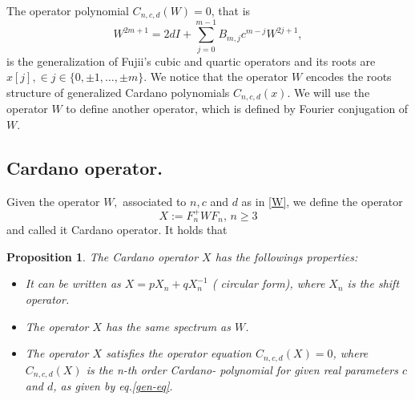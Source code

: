 \documentclass[11pt,reqno]{amsart}
\newtheorem{proposition}[theorem]{Proposition}
\begin{document}
The operator polynomial $C_{n,c,d}(W)=0$, that is 
\begin{equation}\label{CO}
    W^{2m+1}=2dI+\sum\limits_{j=0}^{m-1}B_{m,j}c^{m-j}W^{2j+1},
\end{equation}
is the generalization of Fujii's cubic and quartic operators\cite{Fujii2013} and its roots are $x[j],\in j\in\{0, \pm 1,\ldots, \pm m\}$. We notice that the operator $W$ encodes the roots structure of generalized Cardano polynomials $C_{n,c,d}(x)$. We will use the operator $W$ to define another operator, which is defined by Fourier conjugation of $W$.

\subsection{Cardano operator.}
Given the operator $W,$ associated to $n, c$ and $d$ as in \eqref{W}, we define the operator 
\begin{equation} \label{Cardano-operator}X:=F_n^+WF_n,\, n\geq 3\end{equation} and called it Cardano operator. It holds that
\begin{proposition}\label{th-X}
  The Cardano operator $X$ has the followings properties:  
  \begin{itemize}
      \item[a)] It can be written as $X=pX_n+qX_n^{-1}$ ( circular form),  where $X_n$ is the shift operator.
      \item[b)] The operator $X$ has the same spectrum as $W$.
      \item[c)] The operator $X$ satisfies the operator equation $C_{n,c,d}(X)=0$, where $C_{n,c,d}(X)$ is the n-th order Cardano- polynomial for  given real parameters $c$ and $d$, as given by eq.\eqref{gen-eq}.
      \end{itemize}
\end{proposition}
\end{document}
